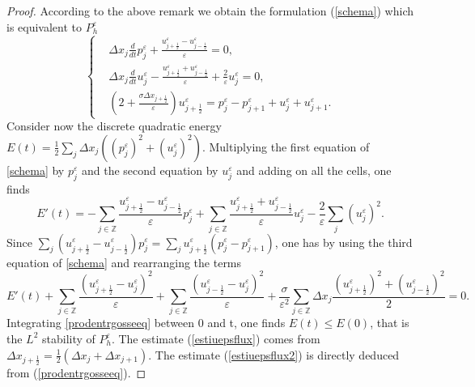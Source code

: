 \documentclass[a4paper,french,english,10pt]{article}
\newcommand\eps{\varepsilon}
\begin{document}
\begin{proof}
According to the above remark we obtain  
the formulation 
(\ref{schema}) 
which is 
equivalent to $P_h^\eps$
\begin{equation}\label{schema}
\left\{
\begin{aligned}
&\Delta x_j\frac{d}{dt}p^{\eps}_j +\frac{u_{j+\frac12 }^{\eps} -
u_{j-\frac12 }^{\eps} }{\eps} = 0,\\
&\Delta x_j\frac{d}{dt}u^{\eps}_j-\frac{u_{j+\frac12 }^{\eps}+
u_{j-\frac12 }^{\eps}}{\eps} +\frac{2}{\eps}u_j^{\eps}=0, \\
&
\left( 2
+\frac{\sigma \Delta x_{j+\frac12}
 }{\eps}
\right) u_{j+\frac12 }^{\eps} 
=p^{\eps}_j-p^{\eps}_{j+1}+u^{\eps}_j+u^{\eps}_{j+1}
.
\end{aligned}
\right.
\end{equation}
Consider now the discrete quadratic energy
$E(t)=\frac12 \sum_j \Delta x_j ((p^{\eps}_j)^2+(u^{\eps}_j)^2)$.
 Multiplying the first equation of \eqref{schema} by $p_j^{\eps}$ and the second
equation by $u_j^{\eps}$ and adding on all the cells, one finds
\begin{equation*}
 E'(t)=-\sum_{j\in \mathbb{Z}} \frac{
u_{j+\frac12 }^{\eps}-u_{j-\frac12 }^{\eps}}{\eps}p^{\eps}_j + \sum_{j\in
\mathbb{Z}} \frac{
u_{j+\frac12 }^{\eps}+u_{j-\frac12 }^{\eps}}{\eps}u^{\eps}_j
-\frac{2}{\eps}\sum_j (u^{\eps}_j)^2.
\end{equation*}
Since $
\sum_{j}(
u_{j+\frac12 }^{\eps}-u_{j-\frac12 }^{\eps})p^{\eps}_j =
\sum_{j} u_{j+\frac12 }^{\eps}(p^{\eps}_j-p^{\eps}_{j+1})$, one
has  by using the third equation of \eqref{schema} and rearranging the
terms
\begin{equation}\label{prodentrgosseeq}
E'(t)+\sum_{j\in \mathbb{Z}} \frac{
(u_{j+\frac12 }^{\eps}-u^{\eps}_j)^2 }{\eps}+\sum_{j\in \mathbb{Z}} \frac{
(u_{j-\frac12 }^{\eps}-u^{\eps}_j)^2 }{\eps} +
\frac{\sigma}{\eps^2}\sum_{j\in \mathbb{Z}} \Delta x_{j}
\frac{(u_{j+\frac12 }^{\eps})^2+(u_{j-\frac12 }^{\eps})^2}{2}= 0.
\end{equation}
Integrating  \eqref{prodentrgosseeq} between 0 and t, one finds  $E(t)\leq E(0)$, that is the $L^2$ stability of $P_h^\eps$.
The estimate  (\ref{estiuepsflux}) 
comes from 
$\Delta x_{j+\frac12}=\frac12( \Delta x_{j}+\Delta x_{j+1})$. The estimate 
 (\ref{estiuepsflux2}) is directly deduced from
(\ref{prodentrgosseeq}).
\end{proof}
\end{document}
